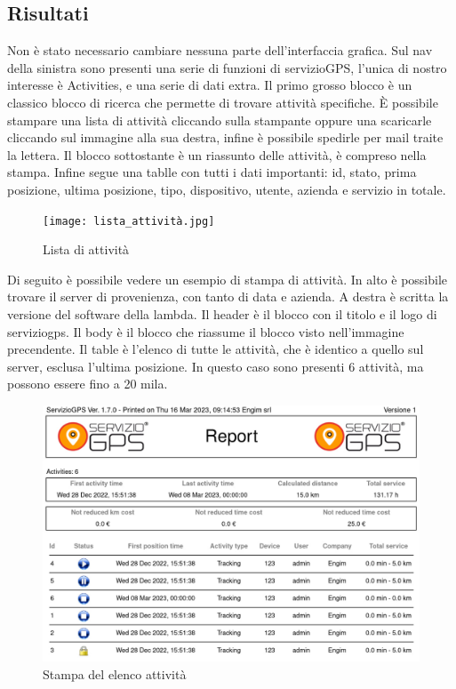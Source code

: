 \documentclass[12pt]{article}
\begin{document}
\subsection{Risultati}
Non è stato necessario cambiare nessuna parte dell'interfaccia grafica.
Sul nav della sinistra sono presenti una serie di funzioni di servizioGPS, 
l'unica di nostro interesse è Activities, e una serie di dati extra. 
Il primo grosso blocco è un classico blocco di ricerca che permette 
di trovare attività specifiche.
È possibile stampare una lista di attività cliccando sulla stampante oppure una 
scaricarle cliccando sul immagine alla sua destra, infine è possibile spedirle 
per mail traite la lettera. 
Il blocco sottostante è un riassunto delle attività, è compreso nella stampa. 
Infine segue una tablle con tutti i dati importanti: id, stato, 
prima posizione, ultima posizione, tipo, dispositivo, utente, 
azienda e servizio in totale. 
\begin{figure}[H]
\texttt{[image: lista\_attività.jpg]}
\caption{Lista di attività}
\end{figure}
Di seguito è possibile vedere un esempio di stampa di attività. 
In alto è possibile trovare il server di provenienza, con tanto di data e 
azienda.
A destra è scritta la versione del software della lambda. 
Il header è il blocco con il titolo e il logo di serviziogps.
Il body è il blocco che riassume il blocco visto nell'immagine precendente. 
Il table è l'elenco di tutte le attività, che è identico a quello sul server, 
esclusa l'ultima posizione.
In questo caso sono presenti 6 attività, ma possono essere fino a 20 mila. 
\begin{figure}[H]
\includegraphics[width =\textwidth]{report.png}
\caption{Stampa del elenco attività}
\end{figure}
\end{document}
